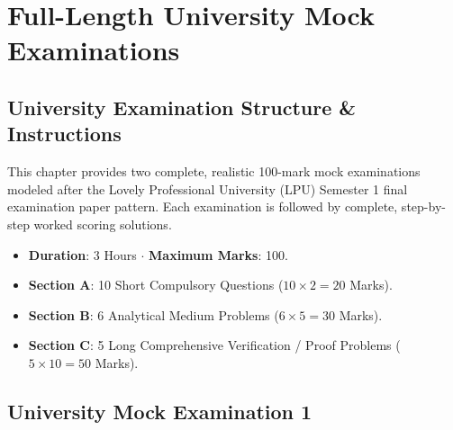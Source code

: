 \chapter{Full-Length University Mock Examinations}
\label{chap:mock-examinations}

\section{University Examination Structure \& Instructions}

This chapter provides two complete, realistic 100-mark mock examinations modeled after the Lovely Professional University (LPU) Semester 1 final examination paper pattern. Each examination is followed by complete, step-by-step worked scoring solutions.

\begin{important}
\begin{itemize}[leftmargin=1.5em]
    \item \textbf{Duration}: 3 Hours $\cdot$ \textbf{Maximum Marks}: 100.
    \item \textbf{Section A}: 10 Short Compulsory Questions ($10 \times 2 = 20$ Marks).
    \item \textbf{Section B}: 6 Analytical Medium Problems ($6 \times 5 = 30$ Marks).
    \item \textbf{Section C}: 5 Long Comprehensive Verification / Proof Problems ($5 \times 10 = 50$ Marks).
\end{itemize}
\end{important}

\section{University Mock Examination 1}

